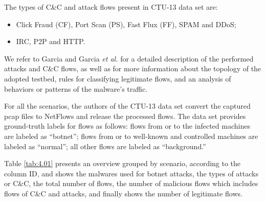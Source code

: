 The types of C\&C and attack flows present in CTU-13 data set are:

\begin{itemize}
	\item {} Click Fraud (CF), Port Scan (PS), Fast Flux (FF), SPAM and DDoS;
	\item {} IRC, P2P and HTTP.
\end{itemize}

We refer to Garcia \cite{garcia2014identifying} and Garcia \emph{et al.} \cite{garcia2014empirical} for a detailed description of the performed attacks and C\&C flows, as well as for more information about the topology of the adopted testbed, rules for classifying legitimate flows, and an analysis of behaviors or patterns of the malware's traffic.

For all the scenarios, the authors of the CTU-13 data set convert the captured pcap files to NetFlows and release the processed flows. The data set provides ground-truth labels for flows as follows: flows from or to the infected machines are labeled as “botnet”; flows from or to well-known and controlled machines are labeled as “normal”; all other flows are labeled as “background.”

Table \ref{tab:4.01} presents an overview grouped by scenario, according to the column ID, and shows the malwares used for botnet attacks, the types of attacks or C\&C, the total number of flows, the number of malicious flows which includes flows of C\&C and attacks, and finally shows the number of legitimate flows.

